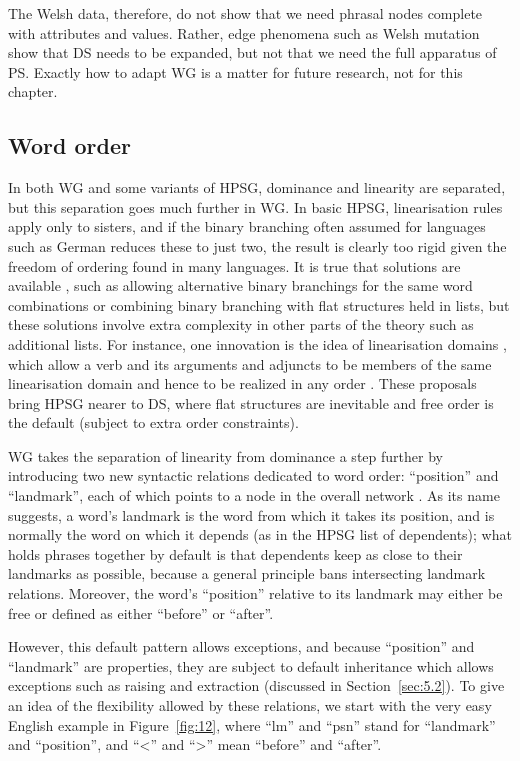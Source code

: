 \documentclass[output=paper
	        ,collection
	        ,collectionchapter
 	        ,biblatex
                ,babelshorthands
                ,newtxmath
                ,draftmode
                ,colorlinks, citecolor=brown
]{langscibook}
\begin{document}
The Welsh data, therefore, do not show that we need phrasal nodes complete with attributes and values. Rather, edge phenomena such as Welsh mutation show that DS needs to be expanded, but not that we need the full apparatus of PS. Exactly how to adapt WG is a matter for future research, not for this chapter.


\subsection{Word order}
\label{sec:4.4}

In both WG and some variants of HPSG, dominance and linearity are separated, but this separation goes much further in WG. In basic HPSG, linearisation rules apply only to sisters, and if the binary branching often assumed for languages such as German \citep[Section~10.3]{MuellerGT-Eng2} reduces these to just two, the result is clearly too rigid given the freedom of ordering found in many languages. It is true that solutions are available \citep[Chapter~10]{MuellerGT-Eng2}, such as allowing alternative binary branchings for the same word combinations or combining binary branching with flat structures held in lists, but these solutions involve extra complexity in other parts of the theory such as additional lists. For instance, one innovation is the idea of linearisation domains \citep{Reape94a,Kathol2000a,Babel}, which allow a verb and its arguments and adjuncts to be members of the same linearisation domain and hence to be realized in any order \citep[302]{MuellerGT-Eng2}. These proposals bring HPSG nearer to DS, where flat structures are inevitable and free order is the default (subject to extra order constraints).

WG takes the separation of linearity from dominance a step further by introducing two new syntactic relations dedicated to word order: ``position'' and ``landmark'', each of which points to a node in the overall network \citep{Hudson2018a}. As its name suggests, a word’s landmark is the word from which it takes its position, and is normally the word on which it depends (as in the HPSG list of dependents); what holds phrases together by default is that dependents keep as close to their landmarks as possible, because a general principle bans intersecting landmark relations. Moreover, the word’s ``position'' relative to its landmark may either be free or defined as either ``before'' or ``after''.

However, this default pattern allows exceptions, and because ``position'' and ``landmark'' are properties, they are subject to default inheritance which allows exceptions such as raising and extraction (discussed in Section~\ref{sec:5.2}). To give an idea of the flexibility allowed by these relations, we start with the very easy English example in Figure~\ref{fig:12}, where ``lm'' and ``psn'' stand for ``landmark'' and ``position'', and ``<'' and ``>'' mean ``before'' and ``after''.
\end{document}
